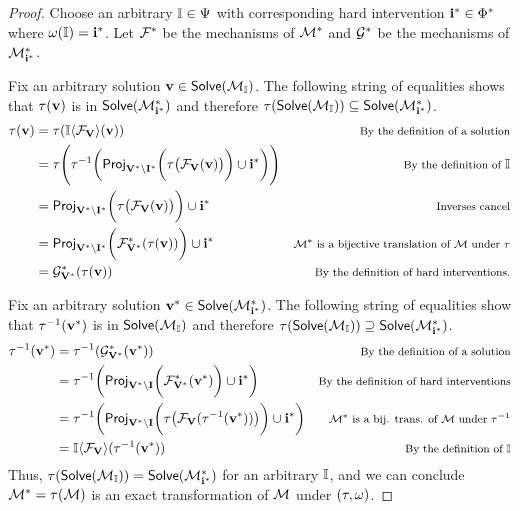\documentclass[twoside,11pt]{article}
\begin{document}
\begin{proof}
Choose an arbitrary $\intal \in \intals$ with corresponding hard intervention $\intpset^* \in \hardintals^*$ where $\intmap(\intal) = \intpset^*$. Let $\mechanism{ }^*$ be the mechanisms of $\model^*$ and $\mechanismm{ }^*$ be the mechanisms of $\model^*_{\intpset^*}$.

Fix an arbitrary solution $\tset \in \sols(\model_{\intal})$. The following string of equalities shows that $\setmap(\tset)$ is in $\sols(\model^*_{\intpset^*})$ and therefore $\setmap(\sols(\model_{\intal})) \subseteq \sols(\model^*_{\intpset^*})$.
\begin{align*}
\footnotesize
 \setmap(\tset) &= \setmap(\intal\langle \mechanism{\allvars}\rangle(\tset)) & \text{\footnotesize By the definition of a solution} \\
  &= \setmap\Bigg(\setmap^{-1}\bigg(\Project{\setmap\big(\mechanism{\allvars}(\tset)\big)}{\allvars^* \setminus \intvars^*} \cup \intpset^*\bigg) \Bigg) & \text{\footnotesize By the definition of } \intal \\
  &= \Project{\setmap\big(\mechanism{\allvars}(\tset)\big)}{\allvars^* \setminus \intvars^* } \cup \intpset^* & \text{\footnotesize Inverses cancel} \\
  &= \Project{\mechanism{\allvars^*}^*(\setmap(\tset))}{\allvars^* \setminus \intvars^* } \cup \intpset^* & \text{\footnotesize $\model^*$ is a bijective translation of $\model$ under $\setmap$} \\
  &= \mechanismm{\allvars^*}^*(\setmap(\tset)) & \text{\footnotesize By the definition of hard interventions.} \\
\end{align*} 

 Fix an arbitrary solution $\tset^* \in \sols(\model^*_{\intpset^*})$. The following string of equalities show that $\setmap^{-1}(\tset^*)$ is in $\sols(\model_{\intal})$ and therefore $\setmap(\sols(\model_{\intal})) \supseteq \sols(\model^*_{\intpset^*})$.
\begin{align*}
 \setmap^{-1}(\tset^*) &= \setmap^{-1}(\mechanismm{\allvars^*}^*(\tset^*)) & \text{\footnotesize By the definition of a solution} \\
 &= \setmap^{-1}\bigg(\Project{\mechanism{\allvars^*}^*(\tset^*)}{\allvars^* \setminus \intvars} \cup \intpset^* \bigg) & \text{\footnotesize By the definition of hard interventions} \\
 &= \setmap^{-1}\bigg(\Project{\tau\big(\mechanism{\allvars}(\setmap^{-1}(\tset^*))\big)}{\allvars^* \setminus \intvars} \cup \intpset^*\bigg) & \text{\footnotesize$\model^*$ is a bij. trans. of $\model$ under $\setmap^{-1}$} \\
 &= \intal\langle \mechanism{\allvars}\rangle(\setmap^{-1}(\tset^*)) & \text{\footnotesize By the definition of $\intal$} \\
\end{align*} 
Thus, $\setmap(\sols(\model_{\intal})) = \sols(\model^*_{\intpset^*})$ for an arbitrary $\intal$, and we can conclude $\model^* = \setmap(\model)$ is an exact transformation of $\model$ under $(\setmap, \intmap)$.
\end{proof}
\end{document}
